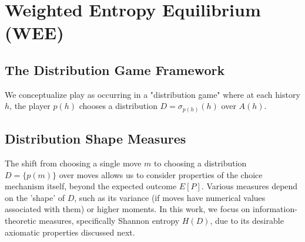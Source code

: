 \documentclass{article}
\begin{document}
\section{Weighted Entropy Equilibrium (WEE)}

\subsection{The Distribution Game Framework}
We conceptualize play as occurring in a "distribution game" where at each history $h$, the player $p(h)$ chooses a distribution $D = \sigma_{p(h)}(h)$ over $A(h)$.

\subsection{Distribution Shape Measures}
The shift from choosing a single move $m$ to choosing a distribution $D = \{p(m)\}$ over moves allows us to consider properties of the choice mechanism itself, beyond the expected outcome $E[P]$. Various measures depend on the 'shape' of $D$, such as its variance (if moves have numerical values associated with them) or higher moments. In this work, we focus on information-theoretic measures, specifically Shannon entropy $H(D)$, due to its desirable axiomatic properties discussed next.
\end{document}
